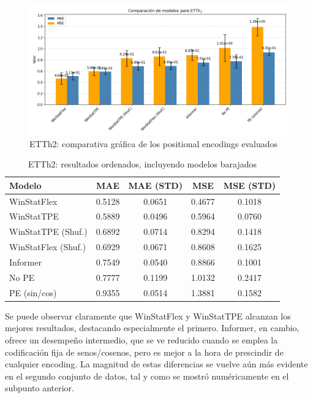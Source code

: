 \begin{figure}[!ht]
	\centering
	\includegraphics[scale=0.475]{img/etth2fin}
	\caption{ETTh2: comparativa gráfica de los positional encodings evaluados}
	\label{etth2fin}
\end{figure}




\begin{table}[ht]
	\centering
	\begin{tabular}{l|c|c|c|c}
		\toprule
		Modelo & {MAE} & {MAE (STD)} & {MSE} & {MSE (STD)}  \\
		\midrule
		WinStatFlex            & 0.5128 & 0.0651 & 0.4677 & 0.1018 \\
		WinStatTPE             & 0.5889 & 0.0496 & 0.5964 & 0.0760 \\
		WinStatTPE (Shuf.)     & 0.6892 & 0.0714 & 0.8294 & 0.1418 \\
		WinStatFlex (Shuf.)    & 0.6929 & 0.0671 & 0.8608 & 0.1625 \\
		Informer               & 0.7549 & 0.0540 & 0.8866 & 0.1001 \\
		No PE                  & 0.7777 & 0.1199 & 1.0132 & 0.2417 \\
		PE (sin/cos)           & 0.9355 & 0.0514 & 1.3881 & 0.1582 \\
		\bottomrule
	\end{tabular}
	\caption{ETTh2: resultados ordenados, incluyendo modelos barajados}
	\label{etth2fintab}
\end{table}




Se puede observar claramente que WinStatFlex y WinStatTPE alcanzan los mejores resultados, destacando especialmente el primero. Informer, en cambio, ofrece un desempeño intermedio, que se ve reducido cuando se emplea la codificación fija de senos/cosenos, pero es mejor a la hora de prescindir de cualquier encoding. La magnitud de estas diferencias se vuelve aún más evidente en el segundo conjunto de datos, tal y como se mostró numéricamente en el subpunto anterior.\\

